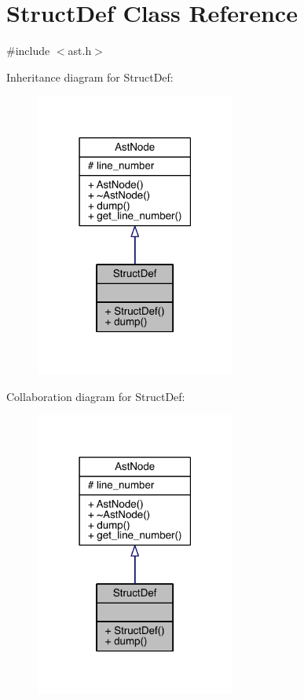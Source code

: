 \hypertarget{class_struct_def}{}\section{Struct\+Def Class Reference}
\label{class_struct_def}


{\ttfamily \#include $<$ast.\+h$>$}



Inheritance diagram for Struct\+Def\+:\nopagebreak
\begin{figure}[H]
\begin{center}
\leavevmode
\includegraphics[width=186pt]{class_struct_def__inherit__graph}
\end{center}
\end{figure}


Collaboration diagram for Struct\+Def\+:\nopagebreak
\begin{figure}[H]
\begin{center}
\leavevmode
\includegraphics[width=186pt]{class_struct_def__coll__graph}
\end{center}
\end{figure}
